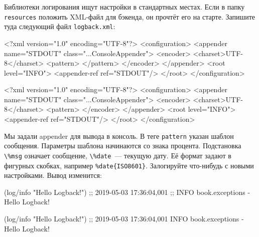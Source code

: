 
Библиотеки логирования ищут настройки в стандартных местах. Если в папку
\verb|resources| положить XML-файл для бэкенда, он прочтёт его на
старте. Запишите туда следующий файл \verb|logback.xml|:

\ifx\devicetype\mobile

\begin{english}
  \begin{xml}
<?xml version="1.0" encoding="UTF-8"?>
<configuration>
  <appender name="STDOUT"
    class="...ConsoleAppender">
    <encoder>
      <charset>UTF-8</charset>
      <pattern>
      </pattern>
    </encoder>
  </appender>
  <root level="INFO">
    <appender-ref ref="STDOUT"/>
  </root>
</configuration>
  \end{xml}
\end{english}

\else

\begin{english}
  \begin{xml}
<?xml version="1.0" encoding="UTF-8"?>
<configuration>
  <appender name="STDOUT" class="...ConsoleAppender">
    <encoder>
      <charset>UTF-8</charset>
      <pattern>%
    </encoder>
  </appender>
  <root level="INFO">
    <appender-ref ref="STDOUT"/>
  </root>
</configuration>
  \end{xml}
\end{english}

\fi


Мы задали appender для вывода в консоль. В теге \verb|pattern| указан шаблон
сообщения. Параметры шаблона начинаются со знака процента. Подстановка
\verb|\%msg| означает сообщение, \verb|\%date|~--- текущую дату. Её
формат задают в фигурных скобках, например \verb|%date{ISO8601}|. Залогируйте
что-нибудь с новыми настройками. Вывод изменится:

\ifx\devicetype\mobile

\begin{english}
  \begin{clojure}
(log/info "Hello Logback!")
;; 2019-05-03 17:36:04,001
;; INFO book.exceptions - Hello Logback!
  \end{clojure}
\end{english}

\else

\begin{english}
  \begin{clojure}
(log/info "Hello Logback!")
;; 2019-05-03 17:36:04,001 INFO book.exceptions - Hello Logback!
  \end{clojure}
\end{english}

